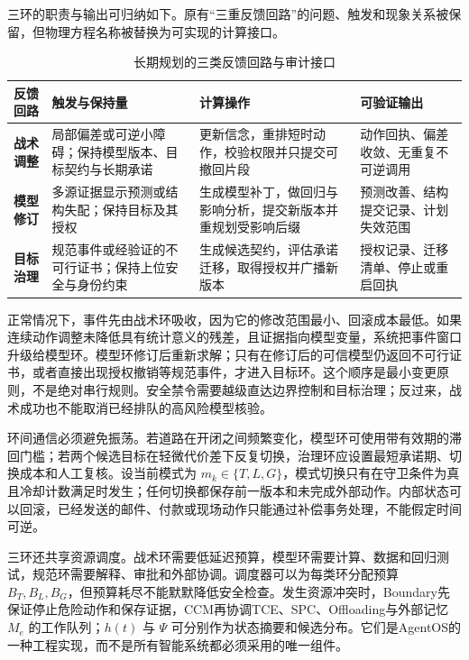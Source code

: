 三环的职责与输出可归纳如下。原有“三重反馈回路”的问题、触发和现象关系被保留，但物理方程名称被替换为可实现的计算接口。

\begin{table}[htbp]
\centering
\footnotesize
\renewcommand{\arraystretch}{1.35}
\begin{tabularx}{\textwidth}{l|X|X|X}
\toprule
\rowcolor{structurecolor!20} \textbf{反馈回路} & \textbf{触发与保持量} & \textbf{计算操作} & \textbf{可验证输出} \\
\midrule
\textbf{战术调整} & 局部偏差或可逆小障碍；保持模型版本、目标契约与长期承诺 & 更新信念，重排短时动作，校验权限并只提交可撤回片段 & 动作回执、偏差收敛、无重复不可逆调用 \\
\hline
\textbf{模型修订} & 多源证据显示预测或结构失配；保持目标及其授权 & 生成模型补丁，做回归与影响分析，提交新版本并重规划受影响后缀 & 预测改善、结构提交记录、计划失效范围 \\
\hline
\textbf{目标治理} & 规范事件或经验证的不可行证书；保持上位安全与身份约束 & 生成候选契约，评估承诺迁移，取得授权并广播新版本 & 授权记录、迁移清单、停止或重启回执 \\
\bottomrule
\end{tabularx}
\caption{长期规划的三类反馈回路与审计接口}
\end{table}

正常情况下，事件先由战术环吸收，因为它的修改范围最小、回滚成本最低。如果连续动作调整未降低具有统计意义的残差，且证据指向模型变量，系统把事件窗口升级给模型环。模型环修订后重新求解；只有在修订后的可信模型仍返回不可行证书，或者直接出现授权撤销等规范事件，才进入目标环。这个顺序是最小变更原则，不是绝对串行规则。安全禁令需要越级直达边界控制和目标治理；反过来，战术成功也不能取消已经排队的高风险模型核验。

环间通信必须避免振荡。若道路在开闭之间频繁变化，模型环可使用带有效期的滞回门槛；若两个候选目标在轻微代价差下反复切换，治理环应设置最短承诺期、切换成本和人工复核。设当前模式为 $m_k\in\{T,L,G\}$，模式切换只有在守卫条件为真且冷却计数满足时发生；任何切换都保存前一版本和未完成外部动作。内部状态可以回滚，已经发送的邮件、付款或现场动作只能通过补偿事务处理，不能假定时间可逆。

三环还共享资源调度。战术环需要低延迟预算，模型环需要计算、数据和回归测试，规范环需要解释、审批和外部协调。调度器可以为每类环分配预算 $B_T,B_L,B_G$，但预算耗尽不能默默降低安全检查。发生资源冲突时，Boundary先保证停止危险动作和保存证据，CCM再协调TCE、SPC、Offloading与外部记忆 $M_e$ 的工作队列；$h(t)$ 与 $\Psi$ 可分别作为状态摘要和候选分布。它们是AgentOS的一种工程实现，而不是所有智能系统都必须采用的唯一组件。

